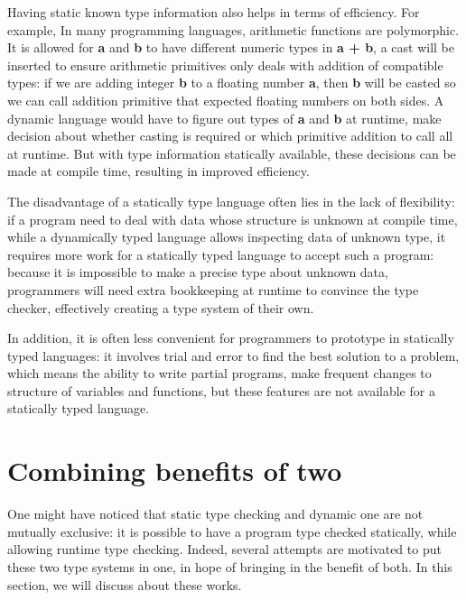 Having static known type information also helps in terms of efficiency.
For example, In many programming languages, arithmetic functions are polymorphic.
It is allowed for \textbf{a} and \textbf{b} to have different numeric types in \textbf{a + b}, a cast will be inserted to ensure arithmetic primitives only deals with addition of compatible types: if we are adding integer \textbf{b} to a floating number \textbf{a}, then \textbf{b} will be casted so we can call addition primitive that expected floating numbers on both sides.
A dynamic language would have to figure out types of \textbf{a} and \textbf{b} at runtime, make decision about whether casting is required or which primitive addition to call all at runtime. But with type information statically available, these decisions can be made at compile time, resulting in improved efficiency.


The disadvantage of a statically type language often lies in the lack of flexibility:
if a program need to deal with data whose structure is unknown at compile time,
while a dynamically typed language allows inspecting data of unknown type,
it requires more work for a statically typed language to accept such a program:
because it is impossible to make a precise type about unknown data,
programmers will need extra bookkeeping at runtime to convince the type checker,
effectively creating a type system of their own.

In addition, it is often less convenient for programmers to prototype
in statically typed languages: it involves trial and error to find the best solution
to a problem, which means the ability to write partial programs, make frequent changes to
structure of variables and functions, but these features are not available for a statically
typed language.


\section{Combining benefits of two}


One might have noticed that static type checking and dynamic one
are not mutually exclusive: it is possible to have a program type checked
statically, while allowing runtime type checking.
Indeed, several attempts are motivated to put these two type systems in one,
in hope of bringing in the benefit of both.
In this section, we will discuss about these works.

